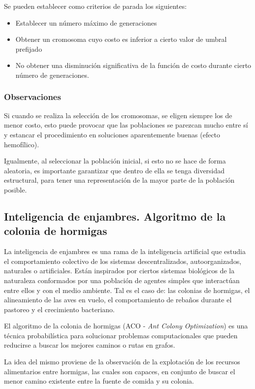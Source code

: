 \documentclass[titlepage, 11pt]{scrartcl}
\begin{document}
	    		Se pueden establecer como criterios de parada los siguientes:
	    		\begin{itemize}
	    			\item Establecer un número máximo de generaciones
	    			\item Obtener un cromosoma cuyo costo es inferior a cierto valor de umbral prefijado
	    			\item No obtener una disminución significativa de la función de costo durante cierto número de generaciones.
	    		\end{itemize}
    		
    		\subsubsection{Observaciones}
    			Si cuando se realiza la selección de los cromosomas, se eligen siempre los de menor costo, esto puede provocar que las poblaciones se parezcan mucho entre sí y estancar el procedimiento en soluciones aparentemente buenas (efecto hemofílico).
    			
    			Igualmente, al seleccionar la población inicial, si esto no se hace de forma aleatoria, es importante garantizar que dentro de ella se tenga diversidad estructural, para tener una representación de la mayor parte de la población posible.
	    
	    
	    
	    \subsection{Inteligencia de enjambres. Algoritmo de la colonia de hormigas}
	    	La inteligencia de enjambres es una rama de la inteligencia artificial que estudia el comportamiento colectivo de los sistemas descentralizados, autoorganizados, naturales o artificiales. Están inspirados por ciertos sistemas biológicos de la naturaleza conformados por una población de agentes simples que interactúan entre ellos y con el medio ambiente. Tal es el caso de: las colonias de hormigas, el alineamiento de las aves en vuelo, el comportamiento de rebaños durante el pastoreo y el crecimiento bacteriano.
	    	
	    	El algoritmo de la colonia de hormigas (ACO - \textit{Ant Colony Optimization}) es una técnica probabilística para solucionar problemas computacionales que pueden reducirse a buscar los mejores caminos o rutas en grafos.
	    	
			La idea del mismo proviene de la observación de la explotación de los recursos alimentarios entre hormigas, las cuales son capaces, en conjunto de buscar el menor camino existente entre la fuente de comida y su colonia.
			
\end{document}
